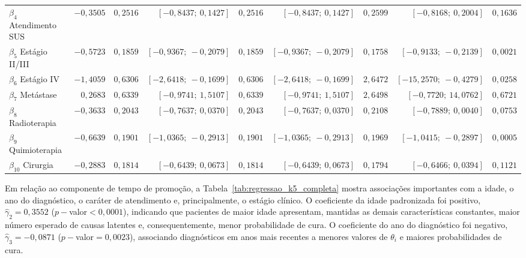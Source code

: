 \documentclass[11pt,a4paper]{article}
\begin{document}
\begin{table}[H]
\begin{adjustbox}{max width=\textwidth}
\begin{tabular}{@{}lrrrrrrrr@{}}
$\beta_{4}$ Atendimento SUS & $-0{,}3505$ & $0{,}2516$ & $[-0{,}8437;\ 0{,}1427]$ & $0{,}2516$ & $[-0{,}8437;\ 0{,}1427]$ & $0{,}2599$ & $[-0{,}8168;\ 0{,}2004]$ & $0{,}1636$ \\
$\beta_{5}$ Estágio II/III & $-0{,}5723$ & $0{,}1859$ & $[-0{,}9367;\ -0{,}2079]$ & $0{,}1859$ & $[-0{,}9367;\ -0{,}2079]$ & $0{,}1758$ & $[-0{,}9133;\ -0{,}2139]$ & $0{,}0021$ \\
$\beta_{6}$ Estágio IV & $-1{,}4059$ & $0{,}6306$ & $[-2{,}6418;\ -0{,}1699]$ & $0{,}6306$ & $[-2{,}6418;\ -0{,}1699]$ & $2{,}6472$ & $[-15{,}2570;\ -0{,}4279]$ & $0{,}0258$ \\
$\beta_{7}$ Metástase & $0{,}2683$ & $0{,}6339$ & $[-0{,}9741;\ 1{,}5107]$ & $0{,}6339$ & $[-0{,}9741;\ 1{,}5107]$ & $2{,}6498$ & $[-0{,}7720;\ 14{,}0762]$ & $0{,}6721$ \\
$\beta_{8}$ Radioterapia & $-0{,}3633$ & $0{,}2043$ & $[-0{,}7637;\ 0{,}0370]$ & $0{,}2043$ & $[-0{,}7637;\ 0{,}0370]$ & $0{,}2108$ & $[-0{,}7889;\ 0{,}0040]$ & $0{,}0753$ \\
$\beta_{9}$ Quimioterapia & $-0{,}6639$ & $0{,}1901$ & $[-1{,}0365;\ -0{,}2913]$ & $0{,}1901$ & $[-1{,}0365;\ -0{,}2913]$ & $0{,}1969$ & $[-1{,}0415;\ -0{,}2897]$ & $0{,}0005$ \\
$\beta_{10}$ Cirurgia & $-0{,}2883$ & $0{,}1814$ & $[-0{,}6439;\ 0{,}0673]$ & $0{,}1814$ & $[-0{,}6439;\ 0{,}0673]$ & $0{,}1794$ & $[-0{,}6466;\ 0{,}0394]$ & $0{,}1121$ \\
\bottomrule
\end{tabular}
\end{adjustbox}
\endgroup
\end{table}

Em relação ao componente de tempo de promoção, a Tabela~\ref{tab:regressao_k5_completa} mostra associações importantes com a idade, o ano do diagnóstico, o caráter de atendimento e, principalmente, o estágio clínico. O coeficiente da idade padronizada foi positivo, $\widehat\gamma_2=0{,}3552$ ($p-$valor$<0{,}0001$), indicando que pacientes de maior idade apresentam, mantidas as demais características constantes, maior número esperado de causas latentes e, consequentemente, menor probabilidade de cura. O coeficiente do ano do diagnóstico foi negativo, $\widehat\gamma_3=-0{,}0871$ ($p-$valor$=0{,}0023$), associando diagnósticos em anos mais recentes a menores valores de $\theta_i$ e maiores probabilidades de cura. 
\end{document}

